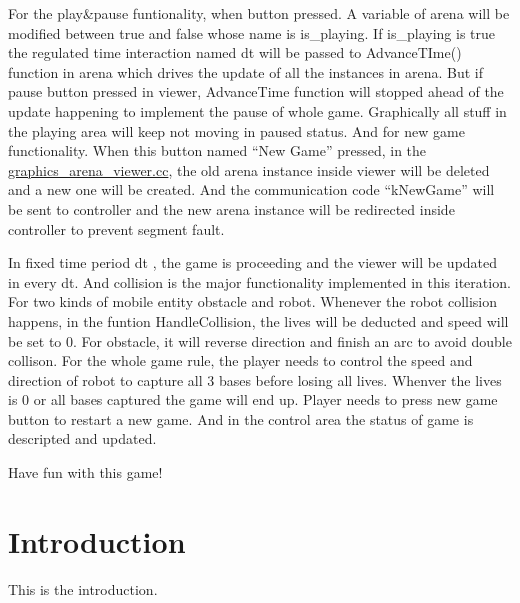 For the play\&pause funtionality, when button pressed. A variable of arena will be modified between true and false whose name is is\+\_\+playing. If is\+\_\+playing is true the regulated time interaction named dt will be passed to Advance\+T\+Ime() function in arena which drives the update of all the instances in arena. But if pause button pressed in viewer, Advance\+Time function will stopped ahead of the update happening to implement the pause of whole game. Graphically all stuff in the playing area will keep not moving in paused status. And for new game functionality. When this button named “\+New Game” pressed, in the \hyperlink{graphics__arena__viewer_8cc}{graphics\+\_\+arena\+\_\+viewer.\+cc}, the old arena instance inside viewer will be deleted and a new one will be created. And the communication code “k\+New\+Game” will be sent to controller and the new arena instance will be redirected inside controller to prevent segment fault.

In fixed time period dt , the game is proceeding and the viewer will be updated in every dt. And collision is the major functionality implemented in this iteration. For two kinds of mobile entity obstacle and robot. Whenever the robot collision happens, in the funtion Handle\+Collision, the lives will be deducted and speed will be set to 0. For obstacle, it will reverse direction and finish an arc to avoid double collison. For the whole game rule, the player needs to control the speed and direction of robot to capture all 3 bases before losing all lives. Whenver the lives is 0 or all bases captured the game will end up. Player needs to press new game button to restart a new game. And in the control area the status of game is descripted and updated.

Have fun with this game!\hypertarget{index_intro_sec}{}\section{Introduction}\label{index_intro_sec}
This is the introduction. 